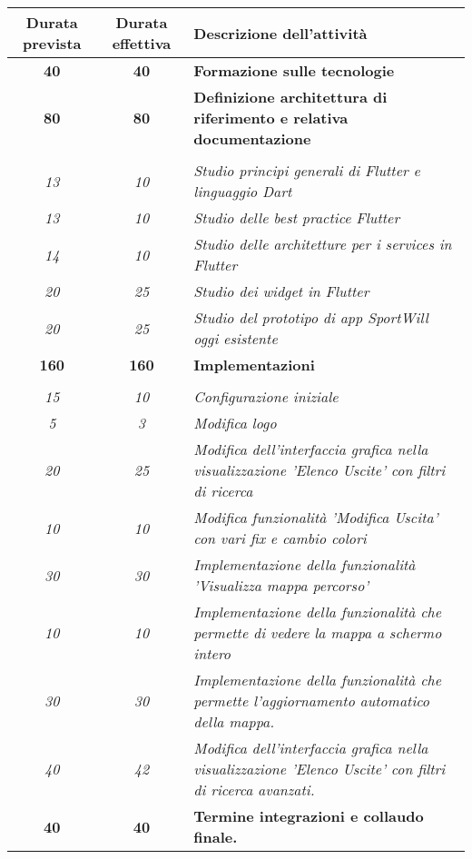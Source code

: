 \begin{center}
	\begin{table}[h!]
		
		\label{tab:Confronto tra ore previste e ore effettive}
		\begin{tabularx}{\textwidth}{|c|c|X|}
			
			\hline
			\textbf{Durata prevista} & \textbf{Durata effettiva} & \textbf{Descrizione dell'attività} \\\hline
			
			\textbf{40} & \textbf{40} & \textbf{Formazione sulle tecnologie} \\	 
			\hline
			
			\textbf{80} & \textbf{80} & \textbf{Definizione architettura di riferimento e relativa documentazione} \\  \hdashline
			\multirow{3}{0cm}\\ 
			\textit{13} & \textit{10} & 
			\textit{Studio principi generali di Flutter e linguaggio Dart} \\
			\textit{13} & \textit{10} & 
			\textit{Studio delle best practice Flutter} \\
			\textit{14} & \textit{10} & 
			\textit{Studio delle architetture per i services in Flutter} \\
			\textit{20} & \textit{25} & 
			\textit{Studio dei widget in Flutter} \\
			\textit{20} & \textit{25} & 
			\textit{Studio del prototipo di app SportWill oggi esistente} \\
			\hline
			\textbf{160} & \textbf{160} & \textbf{Implementazioni} \\ \hdashline
			\multirow{3}{0cm}\\
			\textit{15} & \textit{10} & 
			\textit{Configurazione iniziale} \\ 
			\textit{5} & \textit{3} & 
			\textit{Modifica logo} \\ 
			\textit{20} & \textit{25} & 
			\textit{Modifica dell’interfaccia grafica nella visualizzazione ’Elenco Uscite’ con filtri di ricerca} \\
			\textit{10} & \textit{10} & 
			\textit{Modifica funzionalità 'Modifica Uscita' con vari fix e cambio colori} \\
			\textit{30} & \textit{30} & 
			\textit{Implementazione della funzionalità 'Visualizza mappa percorso'} \\
			\textit{10} & \textit{10} & 
			\textit{Implementazione della funzionalità che permette di vedere la mappa a schermo intero} \\
			\textit{30} & \textit{30} & 
			\textit{Implementazione della funzionalità che permette l'aggiornamento automatico della mappa.} \\
			\textit{40} & \textit{42} & 
			\textit{Modifica dell'interfaccia grafica nella visualizzazione 'Elenco Uscite' con filtri di ricerca avanzati.} \\
			\hline
			\textbf{40} & \textbf{40} & \textbf{Termine integrazioni e collaudo finale.}  \\ 
			\hline
			

\end{tabularx}
\end{table}
\end{center}
